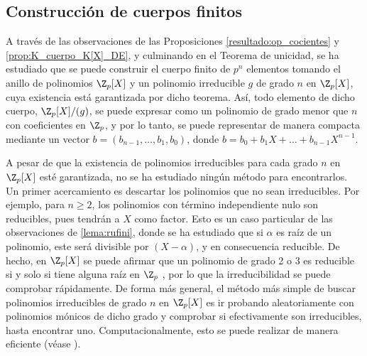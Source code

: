     \subsection*{Construcción de cuerpos finitos}
    
    A través de las observaciones de las Proposiciones \ref{resultado:op_cocientes} y \ref{prop:K_cuerpo_K[X]_DE}, y culminando en el Teorema de unicidad, se ha estudiado que se puede construir el cuerpo finito de $p^n$ elementos tomando el anillo de polinomios $\Z_p[X]$ y un polinomio irreducible $g$ de grado $n$ en $\Z_p[X]$, cuya existencia está garantizada por dicho teorema. Así, todo elemento de dicho cuerpo, $\Z_p[X]/(g)$, se puede expresar como un polinomio de grado menor que $n$ con coeficientes en $\Z_p$, y por lo tanto, se puede representar de manera compacta mediante un vector $b = (b_{n-1}, \ldots , b_1, b_0)$, donde $b = b_0 + b_1X + \ldots + b_{n-1}X^{n-1}$.

    A pesar de que la existencia de polinomios irreducibles para cada grado $n$ en $\Z_p[X]$ esté garantizada, no se ha estudiado ningún método para encontrarlos. Un primer acercamiento es descartar los polinomios que no sean irreducibles. Por ejemplo, para $n\geq2$, los polinomios con término independiente nulo son reducibles, pues tendrán a $X$ como factor. Esto es un caso particular de las observaciones de \ref{lema:rufini}, donde se ha estudiado que si $\alpha$ es raíz de un polinomio, este será divisible por $(X-\alpha)$, y en consecuencia reducible. De hecho, en $\Z_p[X]$ se puede afirmar que un polinomio de grado 2 o 3 es reducible si y solo si tiene alguna raíz en $\Z_p$ \cite[p.~142]{GamboaAnillos}, por lo que la irreducibilidad se puede comprobar rápidamente. De forma más general, el método más simple de buscar polinomios irreducibles de grado $n$ en $\Z_p[X]$ es ir probando aleatoriamente con polinomios mónicos de dicho grado y comprobar si efectivamente son irreducibles, hasta encontrar uno. Computacionalmente, esto se puede realizar de manera eficiente (véase \cite{Shoup2005}).


